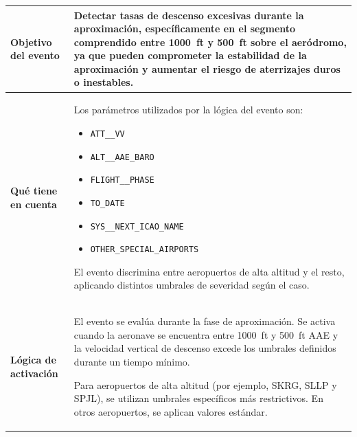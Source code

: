 \documentclass[11pt,a4paper]{article}
\begin{document}
	\renewcommand{\arraystretch}{1.3}
	\begin{longtable}{p{5cm} p{9.5cm}}
		\hline
		\textbf{Objetivo del evento} &
		Detectar tasas de descenso excesivas durante la aproximación, específicamente en el segmento comprendido entre \SI{1000}{ft} y \SI{500}{ft} sobre el aeródromo, ya que pueden comprometer la estabilidad de la aproximación y aumentar el riesgo de aterrizajes duros o inestables. \\
		\hline
		\textbf{Qué tiene en cuenta} &
		Los parámetros utilizados por la lógica del evento son:
		\begin{itemize}
			\item \texttt{ATT\_\_VV}
			\item \texttt{ALT\_\_AAE\_BARO}
			\item \texttt{FLIGHT\_\_PHASE}
			\item \texttt{TO\_DATE}
			\item \texttt{SYS\_\_NEXT\_ICAO\_NAME}
			\item \texttt{OTHER\_SPECIAL\_AIRPORTS}
		\end{itemize}
		El evento discrimina entre aeropuertos de alta altitud y el resto, aplicando distintos umbrales de severidad según el caso. \\
		\hline
		\textbf{Lógica de activación} &
		El evento se evalúa durante la fase de aproximación. Se activa cuando la aeronave se encuentra entre \SI{1000}{ft} y \SI{500}{ft} AAE y la velocidad vertical de descenso excede los umbrales definidos durante un tiempo mínimo.
		
		Para aeropuertos de alta altitud (por ejemplo, SKRG, SLLP y SPJL), se utilizan umbrales específicos más restrictivos. En otros aeropuertos, se aplican valores estándar.
		

\end{longtable}
\end{document}
